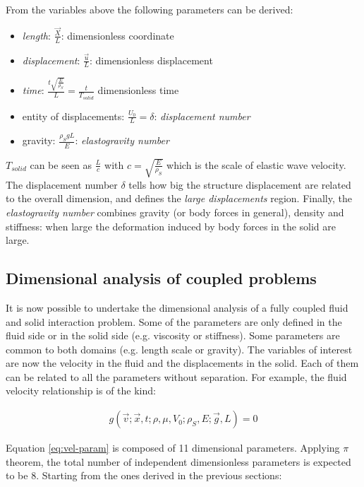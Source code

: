 From the variables above the following parameters can be derived:

\begin{itemize}
	\item \textit{length}: $\frac{\vec{X}}{L}$: dimensionless coordinate
	\item \textit{displacement}: $\frac{\vec{u}}{L}$: dimensionless displacement
	\item \textit{time}: $\frac{t \sqrt{\frac{E}{\rho_S}}}{L} = \frac{t}{T_{solid}}$ dimensionless time
	\item entity of displacements: $\frac{U_0}{L} = \delta$: \textit{displacement number}
	\item gravity: $\frac{\rho_S g L}{E}$: \textit{elastogravity number}
\end{itemize}

$T_{solid}$ can be seen as $\frac{L}{c}$ with $c = \sqrt{\frac{E}{\rho_S}}$ which is the scale of elastic wave velocity. The displacement number $\delta$ tells how big the structure displacement are related to the overall dimension, and defines the \textit{large displacements} region.
Finally, the \textit{elastogravity number} combines gravity (or body forces in general), density and stiffness: when large the deformation induced by body forces in the solid are large. 

\subsection{Dimensional analysis of coupled problems}

It is now possible to undertake the dimensional analysis of a fully coupled fluid and solid interaction problem. Some of the parameters are only defined in the fluid side or in the solid side (e.g. viscosity or stiffness). Some parameters are common to both domains (e.g. length scale or gravity). The variables of interest are now the velocity in the fluid and the displacements in the solid. Each of them can be related to all the parameters without separation. For example, the fluid velocity relationship is of the kind:

\begin{eqnarray}
	 g(\vec{v}; \vec{x},t; \rho, \mu, V_0; \rho_S, E; \vec{g}, L) = 0
	 \label{eq:vel-param}
\end{eqnarray}


Equation \ref{eq:vel-param} is composed of 11 dimensional parameters. Applying $\pi$ theorem, the total number of independent dimensionless parameters is expected to be 8. Starting from the ones derived in the previous sections:

